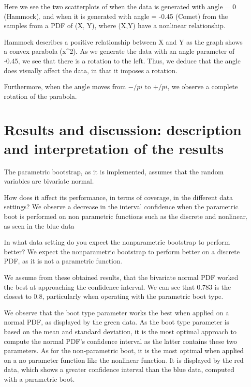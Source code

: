 \documentclass[11pt,]{article}
\begin{document}
Here we see the two scatterplots of when the data is generated with
angle = 0 (Hammock), and when it is generated with angle = -0.45 (Comet)
from the samples from a PDF of (X, Y), where (X,Y) have a nonlinear
relationship.

Hammock describes a positive relationship between X and Y as the graph
shows a convex parabola (x\^{}2). As we generate the data with an angle
parameter of -0.45, we see that there is a rotation to the left. Thus,
we deduce that the angle does visually affect the data, in that it
imposes a rotation.

Furthermore, when the angle moves from \(-/pi\) to \(+/pi\), we observe
a complete rotation of the parabola.

\hypertarget{results-and-discussion-description-and-interpretation-of-the-results}{%
\section{Results and discussion: description and interpretation of the
results}\label{results-and-discussion-description-and-interpretation-of-the-results}}

The parametric bootstrap, as it is implemented, assumes that the random
variables are bivariate normal.

How does it affect its performance, in terms of coverage, in the
different data settings? We observe a decrease in the interval
confidence when the parametric boot is performed on non parametric
functions such as the discrete and nonlinear, as seen in the blue data

In what data setting do you expect the nonparametric bootstrap to
perform better? We expect the nonparametric bootstrap to perform better
on a discrete PDF, as it is not a parametric function.

We assume from these obtained results, that the bivariate normal PDF
worked the best at approaching the confidence interval. We can see that
0.783 is the closest to 0.8, particularly when operating with the
parametric boot type.

We observe that the boot type parameter works the best when applied on a
normal PDF, as displayed by the green data. As the boot type parameter
is based on the mean and standard deviation, it is the most optimal
approach to compute the normal PDF's confidence interval as the latter
contains these two parameters. As for the non-parametric boot, it is the
most optimal when applied on a no parameter function like the nonlinear
function. It is displayed by the red data, which shows a greater
confidence interval than the blue data, computed with a parametric boot.
\end{document}
